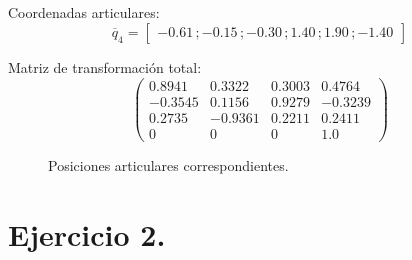 \documentclass[a4paper,12pt]{article}
\begin{document}
\subsection{}
Coordenadas articulares:
\begin{equation*}
    \overline{q}_4 = 
    \begin{bmatrix}
        -0.61\,;-0.15\,;-0.30\,;1.40\,;1.90\,;-1.40
    \end{bmatrix}
\end{equation*}

Matriz de transformación total:
\[\left(\begin{array}{cccc} 0.8941 & 0.3322 & 0.3003 & 0.4764\\ -0.3545 & 0.1156 & 0.9279 & -0.3239\\ 0.2735 & -0.9361 & 0.2211 & 0.2411\\ 0 & 0 & 0 & 1.0 \end{array}\right)\]

\begin{figure}[H]
    \centering
    \begin{adjustbox}{max width=\columnwidth}
    \end{adjustbox}
    \caption{Posiciones articulares correspondientes.}
\end{figure}

\section{Ejercicio 2.}
\end{document}
